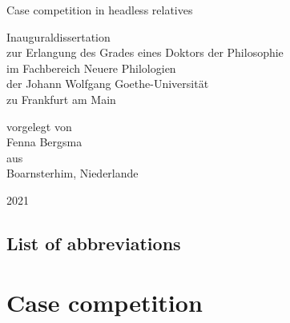 \documentclass[hidelinks,a4paper,oneside]{memoir}
\begin{document}

\frontmatter

\begin{titlingpage}

\center
\Large

\phantom{x}

\vspace{6em}

{\Huge
Case competition in headless relatives}\\

\vspace{6em}

Inauguraldissertation\\
zur Erlangung des Grades eines Doktors der Philosophie\\
im Fachbereich Neuere Philologien\\
der Johann Wolfgang Goethe-Universität\\
zu Frankfurt am Main\\

\vspace{8em}

vorgelegt von\\
Fenna Bergsma\\
aus\\
Boarnsterhim, Niederlande\\

\vspace{8em}

2021

\end{titlingpage}

\clearpage

% 

\clearpage
\tableofcontents

\clearpage
\listoftables

\clearpage
\listoffigures

\chapter*[List of abbreviations]{List of abbreviations}
\begingroup
  \setlength{\LTleft}{-\tabcolsep}
\printacronyms[include=abbr, heading=none]
\endgroup
{}


\mainmatter
\setcounter{secnumdepth}{4}



\part{Case competition}\label{part:case-facts}


\end{document}
